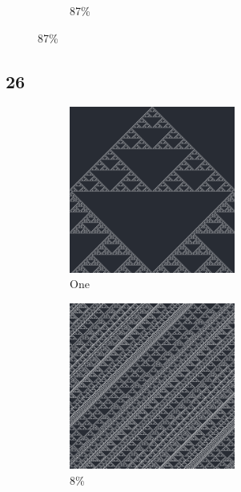 \documentclass[12pt, fleqn]{report}                             %
\theoremstyle{break}                                            %
\begin{document}
\begin{figure}[ht!]
\begin{subfigure}[b]{0.4\linewidth}
          \caption{87\%}
        \end{subfigure}
      \end{figure}


      \clearpage
      \subsection{26}
      \begin{figure}[ht!]
        \centering
        \begin{subfigure}[b]{0.4\linewidth}
          \includegraphics[width=0.6\textwidth]{Images/26/a.png}
          \caption{One}
        \end{subfigure}
        \begin{subfigure}[b]{0.4\linewidth}
          \includegraphics[width=0.6\textwidth]{Images/26/b.png}
          \caption{8\%}
        \end{subfigure}
        \begin{subfigure}[b]{0.4\linewidth}

\end{subfigure}
\end{figure}
\end{document}
